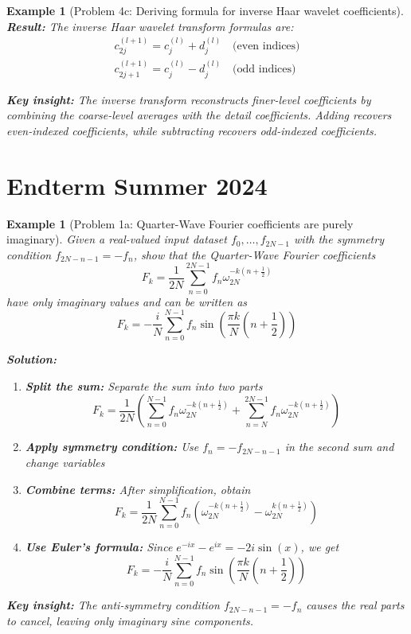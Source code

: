 \documentclass[11pt,a4paper]{article}
\newtheorem{example}[theorem]{Example}
\begin{document}
\begin{example}[Problem 4c: Deriving formula for inverse Haar wavelet coefficients]
\textbf{Result:} The inverse Haar wavelet transform formulas are:
\begin{align}
\boxed{c_{2j}^{(l+1)} = c_j^{(l)} + d_j^{(l)}} \quad \text{(even indices)}\\
\boxed{c_{2j+1}^{(l+1)} = c_j^{(l)} - d_j^{(l)}} \quad \text{(odd indices)}
\end{align}

\textbf{Key insight:} The inverse transform reconstructs finer-level coefficients by combining the coarse-level averages with the detail coefficients. Adding recovers even-indexed coefficients, while subtracting recovers odd-indexed coefficients.
\end{example}

\section{Endterm Summer 2024}

\begin{example}[Problem 1a: Quarter-Wave Fourier coefficients are purely imaginary]
Given a real-valued input dataset $f_0, \ldots, f_{2N-1}$ with the symmetry condition $f_{2N-n-1} = -f_n$, show that the Quarter-Wave Fourier coefficients
$$F_k = \frac{1}{2N} \sum_{n=0}^{2N-1} f_n \omega_{2N}^{-k(n+\frac{1}{2})}$$
have only imaginary values and can be written as
$$F_k = -\frac{i}{N} \sum_{n=0}^{N-1} f_n \sin\left(\frac{\pi k}{N}\left(n + \frac{1}{2}\right)\right)$$

\textbf{Solution:}

\begin{enumerate}
\item \textbf{Split the sum:} Separate the sum into two parts
$$F_k = \frac{1}{2N}\left(\sum_{n=0}^{N-1} f_n \omega_{2N}^{-k(n+\frac{1}{2})} + \sum_{n=N}^{2N-1} f_n \omega_{2N}^{-k(n+\frac{1}{2})}\right)$$

\item \textbf{Apply symmetry condition:} Use $f_n = -f_{2N-n-1}$ in the second sum and change variables

\item \textbf{Combine terms:} After simplification, obtain
$$F_k = \frac{1}{2N} \sum_{n=0}^{N-1} f_n \left(\omega_{2N}^{-k(n+\frac{1}{2})} - \omega_{2N}^{k(n+\frac{1}{2})}\right)$$

\item \textbf{Use Euler's formula:} Since $e^{-ix} - e^{ix} = -2i\sin(x)$, we get
$$F_k = -\frac{i}{N} \sum_{n=0}^{N-1} f_n \sin\left(\frac{\pi k}{N}\left(n + \frac{1}{2}\right)\right)$$
\end{enumerate}

\textbf{Key insight:} The anti-symmetry condition $f_{2N-n-1} = -f_n$ causes the real parts to cancel, leaving only imaginary sine components.
\end{example}
\end{document}
